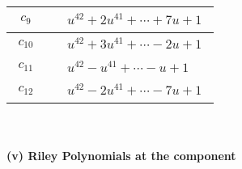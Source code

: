 \documentclass[1p]{elsarticle_modified}
\theoremstyle{definition}
\begin{document}
\begin{tabular}{m{50pt}|m{274pt}}
\hline $$\begin{aligned}c_{9}\end{aligned}$$&$\begin{aligned}
&u^{42}+2 u^{41}+\cdots+7 u+1
\end{aligned}$\\
\hline $$\begin{aligned}c_{10}\end{aligned}$$&$\begin{aligned}
&u^{42}+3 u^{41}+\cdots-2 u+1
\end{aligned}$\\
\hline $$\begin{aligned}c_{11}\end{aligned}$$&$\begin{aligned}
&u^{42}- u^{41}+\cdots- u+1
\end{aligned}$\\
\hline $$\begin{aligned}c_{12}\end{aligned}$$&$\begin{aligned}
&u^{42}-2 u^{41}+\cdots-7 u+1
\end{aligned}$\\
\hline
\end{tabular}\\~\\
\newpage\renewcommand{\arraystretch}{1}
\flushleft \textbf{(v) Riley Polynomials at the component}\newline \\
\end{document}
